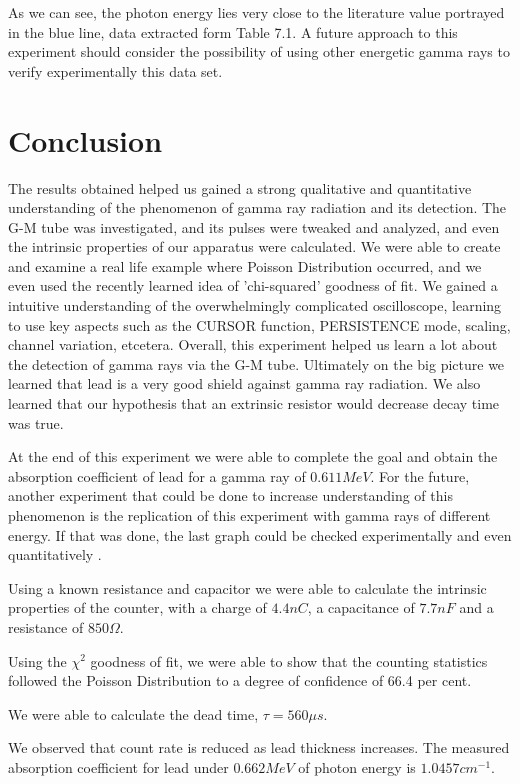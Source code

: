 \documentclass[a4paper]{article}
\begin{document}
  As we can see, the photon energy lies very close to the literature value portrayed in the blue line, data extracted form Table 7.1. A future approach to this experiment should consider the possibility of using other energetic gamma rays to verify experimentally this data set.
  
\clearpage
\section{Conclusion}

The results obtained helped us gained a strong qualitative and quantitative understanding of the phenomenon of gamma ray radiation and its detection. The G-M tube was investigated, and its pulses were tweaked and analyzed, and even the intrinsic properties of our apparatus were calculated. We were able to create and examine a real life example where Poisson Distribution occurred, and we even used the recently learned idea of 'chi-squared' goodness of fit. We gained a intuitive understanding of the overwhelmingly complicated oscilloscope, learning to use key aspects such as the CURSOR function, PERSISTENCE mode, scaling, channel variation, etcetera. Overall, this experiment helped us learn a lot about the detection of gamma rays via the G-M tube. Ultimately on the big picture we learned that lead is a very good shield against gamma ray radiation.  We also learned that our hypothesis that an extrinsic resistor would decrease decay time was true.  

At the end of this experiment we were able to complete the goal and obtain the absorption coefficient of lead for a gamma ray of $0.611MeV$. For the future, another experiment that could be done to increase understanding of this phenomenon is the replication of this experiment with gamma rays of different energy. If that was done, the last graph could be checked experimentally and even quantitatively . 

Using a known resistance and capacitor we were able to calculate the intrinsic properties of the counter, with a charge of $4.4nC$,  a capacitance of $7.7nF$ and a resistance of $850\Omega$. 

Using the $\chi^{2}$ goodness of fit, we were able to show that the counting statistics followed the Poisson Distribution to a degree of confidence of 66.4 per cent. 

We were able to calculate the dead time, $\tau=560\mu s$.

We observed that count rate is reduced as lead thickness increases. The measured absorption coefficient for lead under $0.662MeV$ of photon energy is $1.0457cm^{-1}$.
  
\end{document}
